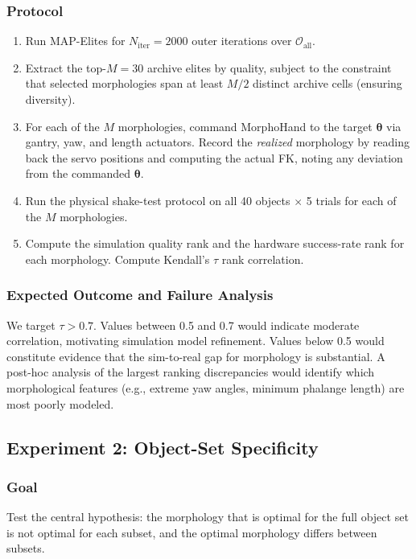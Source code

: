 \documentclass[journal]{IEEEtran}
\newcommand{\btheta}{\boldsymbol{\theta}}
\newcommand{\cO}{\mathcal{O}}
\begin{document}
\subsubsection{Protocol}
\begin{enumerate}
  \item Run MAP-Elites for $N_{\text{iter}} = 2000$ outer iterations over $\cO_{\text{all}}$.
  \item Extract the top-$M = 30$ archive elites by quality, subject to the constraint
    that selected morphologies span at least $M/2$ distinct archive cells (ensuring diversity).
  \item For each of the $M$ morphologies, command MorphoHand to the target $\btheta$ via
    gantry, yaw, and length actuators.
    Record the \emph{realized} morphology by reading back the servo positions and computing
    the actual FK, noting any deviation from the commanded $\btheta$.
  \item Run the physical shake-test protocol on all 40 objects $\times$ 5 trials for
    each of the $M$ morphologies.
  \item Compute the simulation quality rank and the hardware success-rate rank for each
    morphology. Compute Kendall's $\tau$ rank correlation.
\end{enumerate}

\subsubsection{Expected Outcome and Failure Analysis}
We target $\tau > 0.7$.
Values between 0.5 and 0.7 would indicate moderate correlation, motivating simulation
model refinement.
Values below 0.5 would constitute evidence that the sim-to-real gap for morphology is
substantial.
A post-hoc analysis of the largest ranking discrepancies would identify which morphological
features (e.g., extreme yaw angles, minimum phalange length) are most poorly modeled.

\subsection{Experiment 2: Object-Set Specificity}

\subsubsection{Goal}
Test the central hypothesis: the morphology that is optimal for the full object set is
not optimal for each subset, and the optimal morphology differs between subsets.
\end{document}
